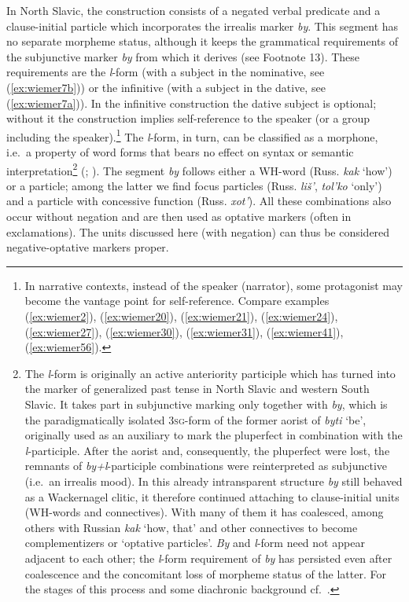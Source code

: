 \documentclass[output=paper,colorlinks,citecolor=brown]{langscibook}
\begin{document}
In North Slavic, the construction consists of a negated verbal predicate and a clause-initial particle which incorporates the irrealis marker \textit{by}. This segment has no separate morpheme status, although it keeps the grammatical requirements of the subjunctive marker \textit{by} from which it derives (see Footnote 13). These requirements are the \textit{l}-form (with a subject in the nominative, see (\ref{ex:wiemer7b})) or the infinitive (with a subject in the dative, see (\ref{ex:wiemer7a})). In the infinitive construction the dative subject is optional; without it the construction implies self-reference to the speaker (or a group including the speaker).\footnote{In narrative contexts, instead of the speaker (narrator), some protagonist may become the vantage point for self-reference. Compare examples (\ref{ex:wiemer2}), (\ref{ex:wiemer20}), (\ref{ex:wiemer21}), (\ref{ex:wiemer24}), (\ref{ex:wiemer27}), (\ref{ex:wiemer30}), (\ref{ex:wiemer31}), (\ref{ex:wiemer41}), (\ref{ex:wiemer56}).} The \textit{l}-form, in turn, can be classified as a morphone, i.e.\ a property of word forms that bears no effect on syntax or semantic interpretation\footnote{The \textit{l}-form is originally an active anteriority participle which has turned into the marker of generalized past tense in North Slavic and western South Slavic. It takes part in subjunctive marking only together with \textit{by}, which is the paradigmatically isolated \textsc{3sg}-form of the former aorist of \textit{byti} `be', originally used as an auxiliary to mark the pluperfect in combination with the \textit{l}-participle. After the aorist and, consequently, the pluperfect were lost, the remnants of \textit{by+l}-participle combinations were reinterpreted as subjunctive (i.e.\ an irrealis mood). In this already intransparent structure \textit{by} still behaved as a Wackernagel clitic, it therefore continued attaching to clause-initial units (WH-words and connectives). With many of them it has coalesced, among others with Russian \textit{kak} `how, that' and other connectives to become complementizers or `optative particles'. \textit{By} and \textit{l}-form need not appear adjacent to each other; the \textit{l}-form requirement of \textit{by} has persisted even after coalescence and the concomitant loss of morpheme status of the latter. For the stages of this process and some diachronic background \mbox{cf.\ \citet{Wiemer2015}}.} \textrm{(\citealt{Aronoff1994}; \citealt{Stump2016}). The segment} \textrm{\textit{by}} \textrm{follows either a WH-word (Russ.} \textrm{\textit{kak}} \textrm{`how') or a particle; among the latter we find focus particles (Russ.} \textrm{\textit{liš'}}, \textrm{\textit{tol'ko}} \textrm{`only') and a particle with concessive function (Russ.} \textrm{\textit{xot'}}). All these combinations also occur without negation and are then used as optative markers (often in exclamations). The units discussed here (with negation) can thus be considered negative-optative markers proper.
\end{document}
